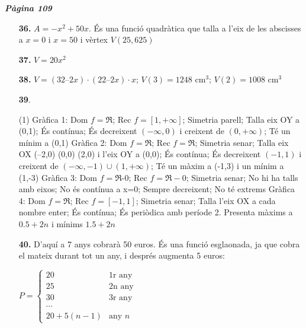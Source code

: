 \documentclass[a4paper, pdf, twoside]{book}
\begin{document}
\begin{multicols}{2}

{\textbf{\em Pàgina 109}} \hrulefill
\begin{enumerate}
\vspace{0.25cm}
\item[\fontfamily{phv}\selectfont\color{blue}\textbf{36. }] 
$A=-x^2+50x$. És una funció quadràtica que talla a l'eix de les abscisses a $x=0$ i $x=50$ i vèrtex $V(25, 625)$ 
 \end{enumerate}
\begin{enumerate}
\vspace{0.25cm}
\item[\fontfamily{phv}\selectfont\color{blue}\textbf{37. }] 
$V=20x^2$
\vspace{0.25cm}
\item[\fontfamily{phv}\selectfont\color{blue}\textbf{38. }] 
$V = (32 – 2x) \cdot (22 – 2x)\cdot x$; $V(3) = 1248$ cm$^3$; $V(2) = 1 008$ cm$^3$
\vspace{0.25cm}



 \item[\fontfamily{phv}\selectfont\color{blue}\textbf{39}. ] 
 \begin{tasks}[column-sep=1em, item-indent=1.3333em](1)
	 \task* Gràfica 1: Dom $f=\Re $; Rec $f=[1,+\infty ]$; Simetria parell; Talla eix OY a (0,1); És contínua; És decreixent $(-\infty ,0)$ i creixent de $(0,+\infty )$; Té un mínim a (0,1)
	 \task* Gràfica 2: Dom $f=\Re $; Rec $f=\Re $; Simetria senar; Talla eix OX (--2,0) (0,0) (2,0) i l'eix OY a (0,0); És contínua; És decreixent $(-1,1)$ i creixent de $(-\infty ,-1)\cup (1,+\infty )$; Té un màxim a (-1,3) i un mínim a (1,-3)
	 \task* Gràfica 3: Dom $f=\Re $-{0}; Rec $f=\Re -{0}$; Simetria senar; No hi ha talls amb eixos; No és contínua a x=0; Sempre decreixent; No té extrems
	 \task* Gràfica 4: Dom $f=\Re $; Rec $f=[-1,1]$; Simetria senar; Talla l'eix OX a cada nombre enter; És contínua; És periòdica amb període 2. Presenta màxims a $0.5+2n$ i mínims $1.5+2n$ 
\end{tasks}
\vspace{0.25cm}
\item[\fontfamily{phv}\selectfont\color{blue}\textbf{40. }] 
 D'aquí a 7 anys cobrarà 50 euros. És una funció esglaonada, ja que cobra el mateix durant tot un any, i després augmenta 5 euros:\par $P =\left \{ \begin {array}{cl} 20 & \text {1r any} \\ 25 & \text {2n any} \\ 30 & \text {3r any} \\ \cdots & \\ 20 + 5(n-1) & \text {any }n \end {array} \right .$
\vspace{0.25cm}



\end{enumerate}
\end{multicols}
\end{document}
